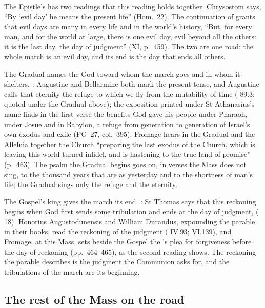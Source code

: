 The Epistle's  has two readings that this reading holds
together. Chrysostom says, ``By `evil day' he means the present life''
(Hom.\ 22). The continuation of  grants that evil days
are many in every life and in the world's history, ``But, for every man, and for
the world at large, there is one evil day, evil beyond all the others: it is the
last day, the day of judgment'' (XI, p.~459). The two are one road: the whole
march is an evil day, and its end is the day that ends all others.

The Gradual names the God toward whom the march goes and in whom it shelters.
: Augustine and Bellarmine both
mark the present tense, and Augustine calls that eternity the refuge to which we
fly from the mutability of time ( 89.3; quoted under the
Gradual above); the exposition printed under St Athanasius's name finds in the
first verse the benefits God gave his people under Pharaoh, under Josue and in
Babylon, a refuge from generation to generation of Israel's own exodus and exile
(PG~27, col.~395). Fromage hears in the Gradual and the Alleluia together the
Church ``preparing the last exodus of the Church, which is leaving this world
turned infidel, and is hastening to the true land of promise'' (p.~463). The
psalm the Gradual begins goes on, in verses the Mass does not sing, to the
thousand years that are as yesterday and to the shortness of man's life; the
Gradual sings only the refuge and the eternity.

The Gospel's king gives the march its end. : St Thomas says that this reckoning begins when God first sends some
tribulation and ends at the day of judgment,  ( 18). Honorius Augustodunensis and William Durandus, expounding the
parable in their books, read the reckoning of the judgment (
IV.93;  VI.139), and Fromage, at this Mass, sets beside the
Gospel the 's plea for forgiveness before the day of reckoning
(pp.~464--465), as the second reading shows. The reckoning the parable describes is the
judgment the Communion asks for, and the tribulations of the march are its
beginning.

\subsection{The rest of the Mass on the road}

